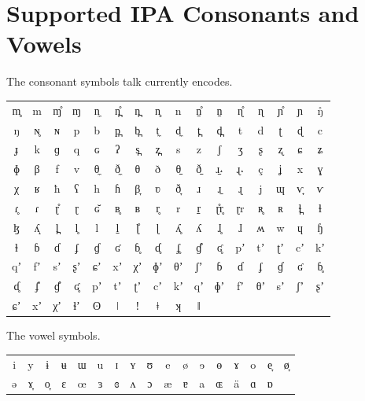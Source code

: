 \appendix

\section{Supported IPA Consonants and Vowels}

The consonant symbols talk currently encodes.

{\ipafont\small\noindent
\begin{tabular}{@{}*{16}{c}}
m̥ & m & ɱ̊ & ɱ & n̼ & n̪̊ & n̪ & n̥ & n & n̠̊ & n̠ & ɳ̊ & ɳ & ɲ̊ & ɲ & ŋ̊ \\
ŋ & ɴ̥ & ɴ & p & b & p̪ & b̪ & t̼ & d̼ & t̪ & d̪ & t & d & ʈ & ɖ & c \\
ɟ & k & ɡ & q & ɢ & ʔ & s̪ & z̪ & s & z & ʃ & ʒ & ʂ & ʐ & ɕ & ʑ \\
ɸ & β & f & v & θ̼ & ð̼ & θ & ð & θ̠ & ð̠ & ɹ̠˔ & ɻ˔ & ç & ʝ & x & ɣ \\
χ & ʁ & ħ & ʕ & h & ɦ & β̞ & ʋ & ð̞ & ɹ & ɹ̠ & ɻ & j & ɰ & ⱱ̟ & ⱱ \\
ɾ̥ & ɾ & ɽ̊ & ɽ & ɢ̆ & ʙ̥ & ʙ & r̥ & r & r̠ & ɽ̊r̥ & ɽr & ʀ̥ & ʀ & ɬ̪ & ɬ \\
ɮ & ʎ̝ & l̪ & l̥ & l & l̠ & ɭ̊ & ɭ & ʎ̥ & ʎ & ɺ̥ & ɺ & ʍ & w & ɥ & ɧ \\
ɫ & ɓ & ɗ & ʄ & ɠ & ʛ & ɓ̥ & ɗ̥ & ʄ̥ & ɠ̊ & ʛ̥ & pʼ & tʼ & ʈʼ & cʼ & kʼ \\
qʼ & fʼ & sʼ & ʂʼ & ɕʼ & xʼ & χʼ & ɸʼ & θʼ & ʃʼ & ɓ & ɗ & ʄ & ɠ & ʛ & ɓ̥ \\
ɗ̥ & ʄ̊ & ɠ̊ & ʛ̥ & pʼ & tʼ & ʈʼ & cʼ & kʼ & qʼ & ɸʼ & fʼ & θʼ & sʼ & ʃʼ & ʂʼ \\
ɕʼ & xʼ & χʼ & ɬʼ & ʘ & ǀ & ǃ & ǂ & ʞ & ǁ &  &  &  &  &  &  \\
\end{tabular}}

The vowel symbols.

{\ipafont\small\noindent
\begin{tabular}{@{}*{17}{c}}
i & y & ɨ & ʉ & ɯ & u & ɪ & ʏ & ʊ & e & ø & ɘ & ɵ & ɤ & o & e̞ & ø̞ \\
ə & ɤ̞ & o̞ & ɛ & œ & ɜ & ɞ & ʌ & ɔ & æ & ɐ & a & ɶ & ä & ɑ & ɒ &  \\
\end{tabular}}
